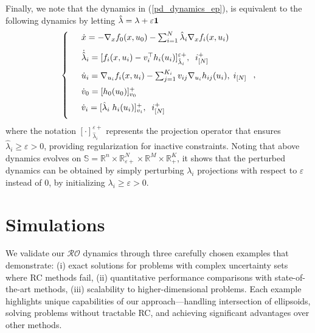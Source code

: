 \documentclass[journal,twoside,web]{ieeecolor}
\newcommand{\rev}[1]{\textcolor{revisionblue}{#1}}
\begin{document}
Finally, we note that the dynamics in (\ref{pd_dynamics_ep}), is equivalent to the following dynamics by letting $\hat{\lambda}=\lambda+\varepsilon {\bf 1}$
\begin{align} \label{pd_dynamics_0}
\left\{
\begin{array}{cl}
\vspace{3mm}
&\dot x=-\nabla_x f_0(x,u_0)-\sum_{i=1}^N\hat{\lambda}_i \nabla_x f_i(x,u_i)\\
\vspace{2mm}
&\dot{\hat{\lambda}}_i=[f_i(x,u_i)-v_i^\top h_i(u_i)]_{\hat{\lambda}_i}^{\varepsilon +},\;\; i^+_{[N]}\\
\vspace{2mm}
&\dot u_i=\nabla_{u_i}f_i(x,u_i)-\sum_{j=1}^{K_i} v_{ij} \nabla_{u_i} h_{ij}(u_i),\; i_{[N]}\\
\vspace{2mm}
&\dot{v}_0=[h_0(u_0)]_{v_0}^+\\
\vspace{2mm}
&\dot v_i=[\hat{\lambda}_i \; h_i(u_i)]_{v_i}^+,\;\;i^+_{[N]}
\end{array}\right.,
\end{align}
\rev{where the notation $[\cdot]_{\hat{\lambda}_i}^{\varepsilon+}$ represents the projection operator that ensures $\hat{\lambda}_i \geq \varepsilon > 0$, providing regularization for inactive constraints.}
Noting that above dynamics evolves on $\mathbb{S}= \mathbb{R}^n \times \mathbb{R}^N_{\varepsilon +} \times \mathbb{R}^M \times \mathbb{R}^K_+$, it shows that the perturbed dynamics can be obtained by simply perturbing $\lambda_i$ projections with respect to $\varepsilon$ instead of $0$, by initializing $\lambda_i \geq \varepsilon > 0$.


\section{Simulations}\label{section_simulations}



\rev{We validate our $\mathcal{RO}$ dynamics through three carefully chosen examples that demonstrate: (i) exact solutions for problems with complex uncertainty sets where RC methods fail, (ii) quantitative performance comparisons with state-of-the-art methods, (iii) scalability to higher-dimensional problems. Each example highlights unique capabilities of our approach—handling intersection of ellipsoids, solving problems without tractable RC, and achieving significant advantages over other methods.}
\end{document}
